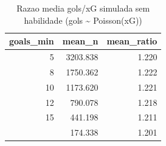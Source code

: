 \begin{table}

\caption{\label{tab:simulacao_vies}Razao media gols/xG simulada sem habilidade (gols \textasciitilde{} Poisson(xG))}
\centering
\begin{tabular}[t]{rrr}
\toprule
goals\_min & mean\_n & mean\_ratio\\
\midrule
5 & 3203.838 & 1.220\\
8 & 1750.362 & 1.222\\
10 & 1173.620 & 1.221\\
12 & 790.078 & 1.218\\
15 & 441.198 & 1.211\\
\addlinespace
20 & 174.338 & 1.201\\
\bottomrule
\end{tabular}
\end{table}
